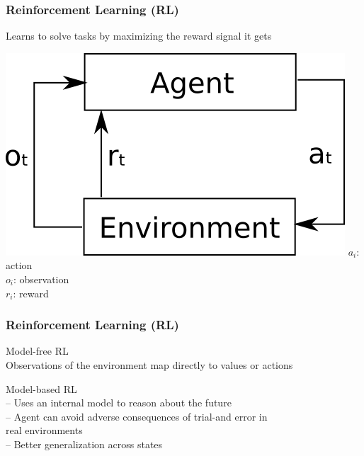 \begin{frame}
    \frametitle{Reinforcement Learning (RL)}

Learns to solve tasks by maximizing the reward signal it gets
\vspace{10mm}

\begin{multicols}{2}
	\includegraphics[width=0.9\columnwidth]{./Images/rl_agent.png}%
    \vfill\columnbreak	
	$a_i$: action\\
	$o_i$: observation\\
	$r_i$: reward
\end{multicols}

\end{frame}
\clearpage

\begin{frame}
    \frametitle{Reinforcement Learning (RL)}

\begin{PraesentationAufzaehlung}
	\item Model-free RL\\
	Observations of the environment map directly to values or actions
	\item Model-based RL\\
	-- Uses an internal model to reason about the future\\
	-- Agent can avoid adverse consequences of trial-and error in\\
	\hspace{5mm} real environments\\
	-- Better generalization across states%
\end{PraesentationAufzaehlung}

\end{frame}
\clearpage

